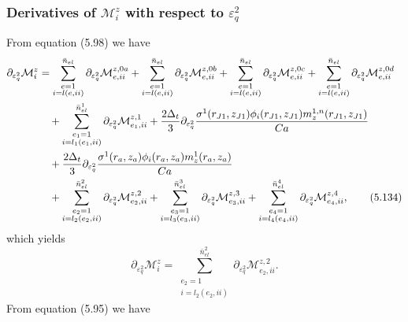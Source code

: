 \documentclass{article}
\begin{document}
\subsubsection{Derivatives of $\mathcal{M}_i^z$ with respect to $\varepsilon_q^2$} %
From equation (5.98) we have
\begin{align}
\partial_{\varepsilon_q^2}\mathcal{M}_i^z &= \sum_{\substack{e=1\\ i=l(e,ii)}}^{\bar{n}_{el}} \partial_{\varepsilon_q^2} \mathcal{M}_{e,ii}^{z,0a} + \sum_{\substack{e=1\\ i=l(e,ii)}}^{\bar{n}_{el}} \partial_{\varepsilon_q^2} \mathcal{M}_{e,ii}^{z,0b} + \sum_{\substack{e=1\\ i=l(e,ii)}}^{\bar{n}_{el}} \partial_{\varepsilon_q^2} \mathcal{M}_{e,ii}^{z,0c} + \sum_{\substack{e=1\\ i=l(e,ii)}}^{\bar{n}_{el}} \partial_{\varepsilon_q^2} \mathcal{M}_{e,ii}^{z,0d} \nonumber\\
&\quad + \sum_{\substack{e_1=1\\ i=l_1(e_1,ii)}}^{\bar{n}_{el}^1} \partial_{\varepsilon_q^2} \mathcal{M}_{e_1,ii}^{z,1} + \frac{2\Delta_t}{3} \partial_{\varepsilon_q^2} \frac{\sigma^1(r_{J1},z_{J1}) \phi_i(r_{J1},z_{J1}) m_z^{1,n}(r_{J1},z_{J1})}{Ca} \nonumber\\
&\quad + \frac{2\Delta_t}{3} \partial_{\varepsilon_q^2} \frac{\sigma^1(r_a,z_a) \phi_i(r_a,z_a) m_z^{1}(r_a,z_a)}{Ca} \nonumber\\
&\quad + \sum_{\substack{e_2=1\\ i=l_2(e_2,ii)}}^{\bar{n}_{el}^2} \partial_{\varepsilon_q^2} \mathcal{M}_{e_2,ii}^{z,2} + \sum_{\substack{e_3=1\\ i=l_3(e_3,ii)}}^{\bar{n}_{el}^3} \partial_{\varepsilon_q^2} \mathcal{M}_{e_3,ii}^{z,3} + \sum_{\substack{e_4=1\\ i=l_4(e_4,ii)}}^{\bar{n}_{el}^4} \partial_{\varepsilon_q^2} \mathcal{M}_{e_4,ii}^{z,4}, \tag{5.134}
\end{align}
which yields
\begin{equation}
\partial_{\varepsilon_q^2}\mathcal{M}_i^z = \sum_{\substack{e_2=1\\ i=l_2(e_2,ii)}}^{\bar{n}_{el}^2} \partial_{\varepsilon_q^2} \mathcal{M}_{e_2,ii}^{z,2}. \tag{5.135}
\end{equation}
From equation (5.95) we have
\end{document}
